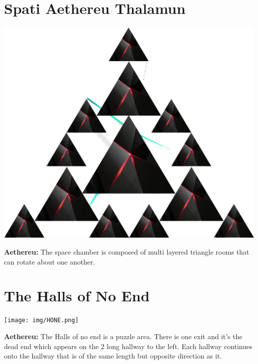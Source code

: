 \section{Spati Aethereu Thalamun}
\begin{center}
	\includegraphics[width=\linewidth]{img/Aethereu.png}	
	
	{\textbf{Aethereu:} The space chamber is composed of multi layered triangle rooms that can rotate about one another.}
\end{center}

\section{The Halls of No End}
\begin{center}
	\texttt{[image: img/HONE.png]} 
	
	{\textbf{Aethereu:} The Halls of no end is a puzzle area. There is one exit and it's the dead end which appears on the 2 long hallway to the left. Each hallway continues onto the hallway that is of the same length but opposite direction as it.}
\end{center}